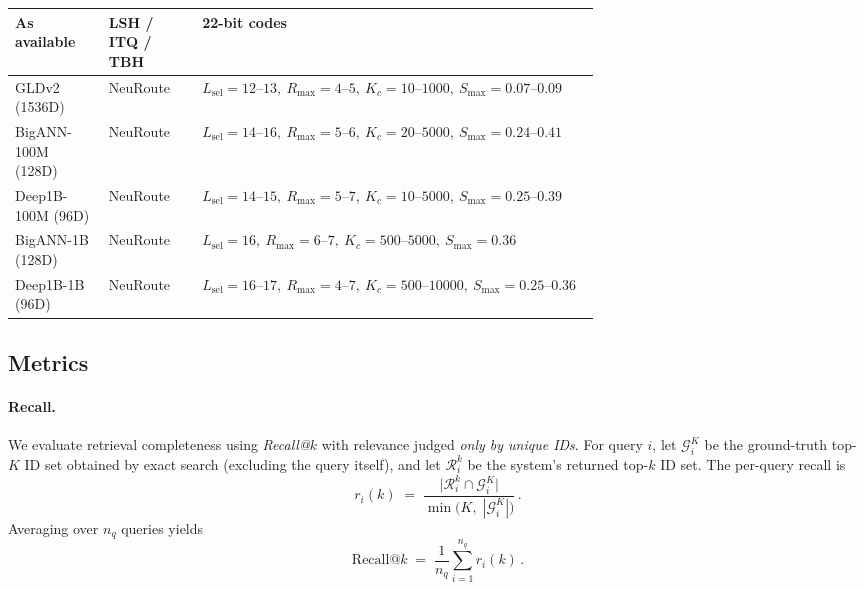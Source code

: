 \documentclass[sigconf, nonacm]{acmart}
\begin{document}
\begin{table}[t]
\begin{adjustbox}{max width=\linewidth}
\begin{tabular}{@{}llp{0.68\linewidth}@{}}
As available & LSH / ITQ / TBH & 22-bit codes \\
\midrule
GLDv2 (1536D) & NeuRoute &
\(L_{\mathrm{sel}}{=}12\text{--}13,\ R_{\max}{=}4\text{--}5,\ K_c{=}10\text{--}1000,\ S_{\max}{=}0.07\text{--}0.09\) \\
BigANN-100M (128D) & NeuRoute &
\(L_{\mathrm{sel}}{=}14\text{--}16,\ R_{\max}{=}5\text{--}6,\ K_c{=}20\text{--}5000,\ S_{\max}{=}0.24\text{--}0.41\) \\
Deep1B-100M (96D) & NeuRoute &
\(L_{\mathrm{sel}}{=}14\text{--}15,\ R_{\max}{=}5\text{--}7,\ K_c{=}10\text{--}5000,\ S_{\max}{=}0.25\text{--}0.39\) \\
BigANN-1B (128D) & NeuRoute &
\(L_{\mathrm{sel}}{=}16,\ R_{\max}{=}6\text{--}7,\ K_c{=}500\text{--}5000,\ S_{\max}{=}0.36\) \\
Deep1B-1B (96D) & NeuRoute &
\(L_{\mathrm{sel}}{=}16\text{--}17,\ R_{\max}{=}4\text{--}7,\ K_c{=}500\text{--}10000,\ S_{\max}{=}0.25\text{--}0.36\) \\
\bottomrule
\end{tabular}
\end{adjustbox}
\vspace{-2mm}
\end{table}

\subsection{Metrics}\label{sec:metrics}


\paragraph{Recall.}
We evaluate retrieval completeness using \emph{Recall@\(k\)} with relevance judged \emph{only by unique IDs}.
For query \(i\), let \(\mathcal{G}_i^{K}\) be the ground-truth top-\(K\) ID set obtained by exact search (excluding the query itself), and let \(\mathcal{R}_i^{k}\) be the system's returned top-\(k\) ID set. The per-query recall is
\begin{equation}
r_i(k) \;=\; \frac{\bigl|\mathcal{R}_i^{k}\cap \mathcal{G}_i^{K}\bigr|}{\min\!\bigl(K,\;|\mathcal{G}_i^{K}|\bigr)}\, .
\end{equation}
Averaging over \(n_q\) queries yields
\begin{equation}
\mathrm{Recall@}k \;=\; \frac{1}{n_q}\sum_{i=1}^{n_q} r_i(k)\, .
\end{equation}
\end{document}
